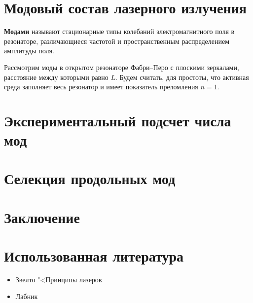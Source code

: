 \documentclass[12pt]{kiarticle}
\begin{document}
\section{Модовый состав лазерного излучения}

\textbf{Модами} называют стационарные типы колебаний электромагнитного поля в резонаторе, различающиеся частотой и пространственным распределением амплитуды поля.

Рассмотрим моды в открытом резонаторе Фабри–Перо с плоскими
зеркалами, расстояние между которыми равно $ L $. Будем считать, для
простоты, что активная среда заполняет весь резонатор и имеет показатель преломления $ n= 1 $.

\newpage
\section{Экспериментальный подсчет числа мод}

\newpage
\section{Селекция продольных мод}


\newpage
\section{Заключение}

\section*{Использованная литература}

\begin{itemize}
	
	\item Звелто "<Принципы лазеров
	
	\item Лабник
	
\end{itemize}
\end{document}
